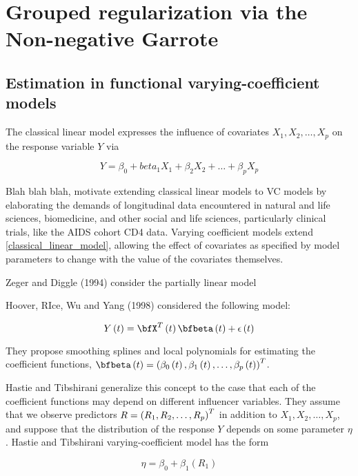 \chapter{Grouped regularization via the Non-negative Garrote}
\label{groupedRegNNGarrote.ch}

\section{Estimation in functional varying-coefficient models}

The classical linear model expresses the influence of covariates $X_1, X_2, \dots, X_p$ on the response variable $Y$ via 

\begin{equation}
Y = \beta_0 + beta_1 X_1 + \beta_2 X_2 + \dots + \beta_p X_p \label{classical_linear_model}
\end{equation}

Blah blah blah, motivate extending classical linear models to VC models by elaborating the demands of longitudinal data encountered in natural and life sciences, biomedicine, and other social and life sciences, particularly clinical trials, like the AIDS cohort CD4 data. Varying coefficient models extend \eqref{classical_linear_model}, allowing the effect of covariates as specified by model parameters to change with the value of the covariates themselves.  

Zeger and Diggle (1994) consider the partially linear model 




Hoover, RIce, Wu and Yang (1998) considered the following model:

\begin{equation}
Y\left(t\right) =  \bfX^T\left(t\right)\bfbeta \left(t\right) + \epsilon\left(t\right) \label{hoover_rice_wu_VC_model}
\end{equation}

They propose smoothing splines and local polynomials for estimating the coefficient functions, $\bfbeta\left(t\right) = \left( \beta_0\left(t\right), \beta_1\left(t\right),\dots,\beta_p\left(t\right) \right)^T$. 

Hastie and Tibshirani generalize this concept to the case that each of the coefficient functions may depend on different influencer variables. They assume that we observe predictors $\boldmath{R} = \left(R_1, R_2, \dots, R_p\right)^T$ in addition to $X_1, X_2, \dots, X_p$, and suppose that the distribution of the response $Y$ depends on some parameter $\eta$. Hastie and Tibshirani  varying-coefficient model has the form

\begin{equation}
\eta = \beta_0 + \beta_1\left(R_1\right) \label{hastie_tibshiran_VC_model}
\end{equation}


